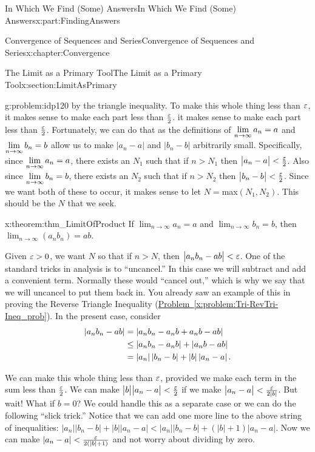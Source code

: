 \begin{partptx}{In Which We Find (Some) Answers}{}{In Which We Find (Some) Answers}{}{}{x:part:FindingAnswers}
\begin{chapterptx}{Convergence of Sequences and Series}{}{Convergence of Sequences and Series}{}{}{x:chapter:Convergence}
\begin{sectionptx}{The Limit as a Primary Tool}{}{The Limit as a Primary Tool}{}{}{x:section:LimitAsPrimary}
\begin{problem}{}{g:problem:idp120}
				by the triangle inequality. To make this whole thing less than \(\varepsilon\), it makes sense to make each part less than \(\frac{\varepsilon}{2}\). it makes sense to make each part less than \(\frac{\varepsilon}{2}\). Fortunately, we can do that as the definitions of \({\displaystyle\lim_{n\rightarrow \infty}a_n}=a\) and \({\displaystyle\lim_{n\rightarrow \infty}b_n}=b\) allow us to make \(\big|a_n-a\big|\) and \(\big|b_n-b\big|\) arbitrarily small. Specifically, since \({\displaystyle\lim_{n\rightarrow \infty}a_n}=a\), there exists an \(N_1\) such that if \(n>N_1\) then \(\big|a_n-a\big|< \frac{\varepsilon}{2}\). Also since \({\displaystyle\lim_{n\rightarrow \infty}b_n}=b\), there exists an \(N_2\) such that if \(n>N_2\) then \(\big|b_n-b\big|< \frac{\varepsilon}{2}\). Since we want both of these to occur, it makes sense to let \(N=\)max\(\left(N_1,N_2\right)\). This should be the \(N\) that we seek.%
			\end{problem}
			\begin{theorem}{}{}{x:theorem:thm_LimitOfProduct}%
				 If \(\displaystyle\lim_{n\rightarrow\infty}a_n=a\) and \(\displaystyle\lim_{n\rightarrow\infty}b_n=b\), then \(\displaystyle\lim_{n\rightarrow\infty}\left(a_n b_n\right)=a b\).%
			\end{theorem}
			 Given \(\varepsilon>0\), we want \(N\) so that if \(n>N\), then \(\big|a_n  b_n-a  b\big|< \varepsilon\). One of the standard tricks in analysis is to ``uncancel.'' In this case we will subtract and add a convenient term. Normally these would ``cancel out,'' which is why we say that we will uncancel to put them back in. You already saw an example of this in proving the Reverse Triangle Inequality (\hyperref[x:problem:Tri-RevTri-Ineq_prob]{Problem~{\xreffont\ref{x:problem:Tri-RevTri-Ineq_prob}}}). In the present case, consider%
			\begin{align*}
				\left|a_n  b_n-a  b\right|& =\left|a_n  b_n-a_n b+a_n b-a  b\right|\\
				& \leq\left|a_n  b_n-a_n  b\right|+\left|a_n b-a b\right|\\
				& =\left|a_n\right|\left|b_n-b\right|+\left|b\right|\left|a_n-a\right|\text{.}
			\end{align*}
			\par
			We can make this whole thing less than \(\varepsilon\), provided we make each term in the sum less than \(\frac{\varepsilon}{2}\). We can make \(\big|b\big|\big|a_n-a\big|< \frac{\varepsilon}{2}\) if we make \(\big|a_n-a\big|< \frac{\varepsilon}{2|b|}\). But wait! What if \(b=0\)? We could handle this as a separate case or we can do the following ``slick trick.'' Notice that we can add one more line to the above string of inequalities: \(\left|a_n\right|\left|b_n-b\right|+\left|b\right|\left|a_n-a\right|\lt \left|a_n \right|\left|b_n-b\right|+\left(\left|b\right|+1\right)\left|a_n-a \right|\). Now we can make \(\left|a_n-a\right|< \frac{\varepsilon}{2\left(|b|+1\right)}\) and not worry about dividing by zero.%

\end{sectionptx}
\end{chapterptx}
\end{partptx}
